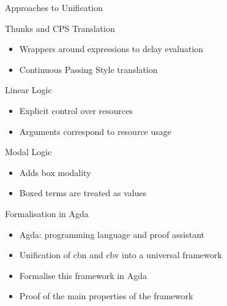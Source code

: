 \documentclass{beamer}
\theoremstyle{definition}
\begin{document}
  \begin{frame}{Approaches to Unification}

  \begin{block}{\alert{Thunks} and \alert{CPS} Translation} \pause
    \begin{itemize}
      \item[\textbullet] Wrappers around expressions to delay evaluation \pause
      \item[\textbullet] Continuous Passing Style translation \pause
    \end{itemize}
    
  \end{block}

  \begin{block}{\alert{Linear} Logic} \pause
    \begin{itemize}
      \item[\textbullet] Explicit control over resources \pause
      \item[\textbullet] Arguments correspond to resource usage \pause
    \end{itemize}
  \end{block}

  \begin{block}{\alert{Modal} Logic} \pause
    \begin{itemize}
      \item[\textbullet] Adds box modality \pause
      \item[\textbullet] Boxed terms are treated as values
    \end{itemize}
  \end{block}

  \end{frame}

  \begin{frame}{Formalisation in Agda}
    \begin{itemize}
      \item[\textbullet] \alert{Agda}: programming language and proof assistant \pause
      \item[\textbullet] Unification of \alert{\textsf{cbn}} and \alert{\textsf{cbv}} into a universal framework \pause  
      \item[\textbullet] Formalise this framework in \alert{Agda} \pause
      \item[\textbullet] Proof of the main properties of the framework
    \end{itemize}
  \end{frame}
\end{document}
